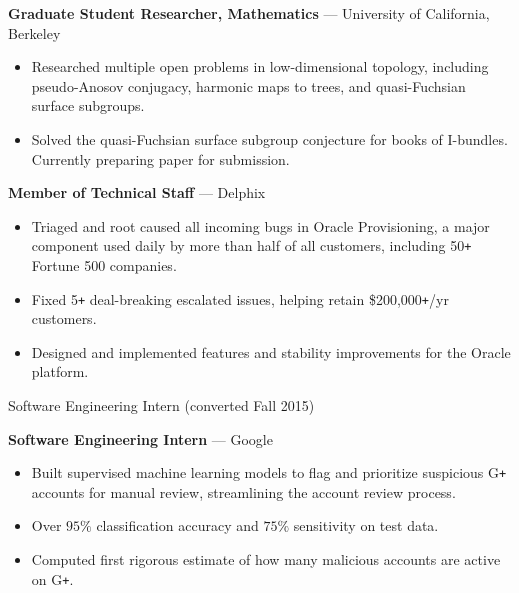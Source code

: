 \documentclass[10pt,letterpaper]{article}
\newcommand{\archive}[1]{}
\newcommand{\dates}[1]{\item[#1\hfill]}
\newcommand{\jobhead}[3]{{\dates{#1}{\bf #3} --- {#2}}}
\newenvironment{jobs}
  {\leftmargini=24.1mm%
   \begin{list}%
    {}
    {\setlength\labelwidth{22mm}\itemsep=1.5mm}}
  {\end{list}}
\begin{document}
\begin{jobs}


\jobhead{2013\,--\,2017} {University of California, Berkeley}{Graduate Student
Researcher, Mathematics} \begin{itemize}

\item Researched multiple open problems in low-dimensional topology, including
pseudo-Anosov conjugacy, harmonic maps to trees, and quasi-Fuchsian surface
subgroups.

\item Solved the quasi-Fuchsian surface subgroup conjecture for books of
I-bundles.  Currently preparing paper for submission.

\end{itemize}
\jobhead{2015\,--\,2016}
{Delphix}{Member of Technical Staff}
\begin{itemize}

\item Triaged and root caused all incoming bugs in Oracle Provisioning,
a major component used daily by more than half of all customers,
including 50\verb!+! Fortune 500 companies.

\item Fixed 5\verb!+! deal-breaking escalated issues, helping
retain \$200,000\verb!+!/yr customers.

\item Designed and implemented features and
stability improvements for the Oracle platform.

\end{itemize}
\vspace{-2mm}
\dates{2015}
Software Engineering Intern (converted Fall 2015)

\archive{
\item Implemented a new data management feature across multiple Delphix
data platforms.
}

\jobhead{2014}
{Google}{Software Engineering Intern}
\begin{itemize}

\item Built supervised machine learning models to flag and prioritize
suspicious G\verb!+!  accounts for manual review, streamlining the account
review process.

\item Over $95\%$ classification accuracy and $75\%$ sensitivity on
test data.

\item Computed first rigorous estimate of how many malicious accounts are
active on G\verb!+!.


\end{itemize}
\end{jobs}
\end{document}
